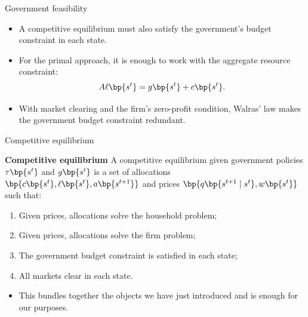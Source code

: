 \documentclass[11pt,xcolor={dvipsnames},aspectratio=159,hyperref={pdftex,pdfpagemode=UseNone,hidelinks,pdfdisplaydoctitle=true},usepdftitle=false]{beamer}
\begin{document}
            \begin{frame}{Government feasibility}
                \begin{itemize}
                    \item A competitive equilibrium must also satisfy the government's budget constraint in each state.
                    \item For the primal approach, it is enough to work with the aggregate resource constraint:
                    \[
                        A \ell\bp{s^t} = g\bp{s^t} + c\bp{s^t}.
                    \]
                    \item With market clearing and the firm's zero-profit condition, Walras' law makes the government budget constraint redundant.
                \end{itemize}
            \end{frame}

	            \begin{frame}{Competitive equilibrium}
	                \begin{beamerboxesrounded}[upper=block head,lower=block body,shadow=false]{\textbf{Competitive equilibrium}}
	                    A competitive equilibrium given government policies $\tau\bp{s^t}$ and $g\bp{s^t}$ is a set of allocations $\bp{c\bp{s^t},\ell\bp{s^t},a\bp{s^{t+1}}}$ and prices $\bp{q\bp{s^{t+1} \mid s^t },w\bp{s^t}}$ such that: 
                    \begin{enumerate}
                        \item Given prices, allocations solve the household problem;
                        \item Given prices, allocations solve the firm problem;
                        \item The government budget constraint is satisfied in each state;
                        \item All markets clear in each state.
                    \end{enumerate}
                \end{beamerboxesrounded}
        
                \begin{itemize}
                    \item This bundles together the objects we have just introduced and is enough for our purposes.
                \end{itemize}
                \end{frame}
\end{document}
